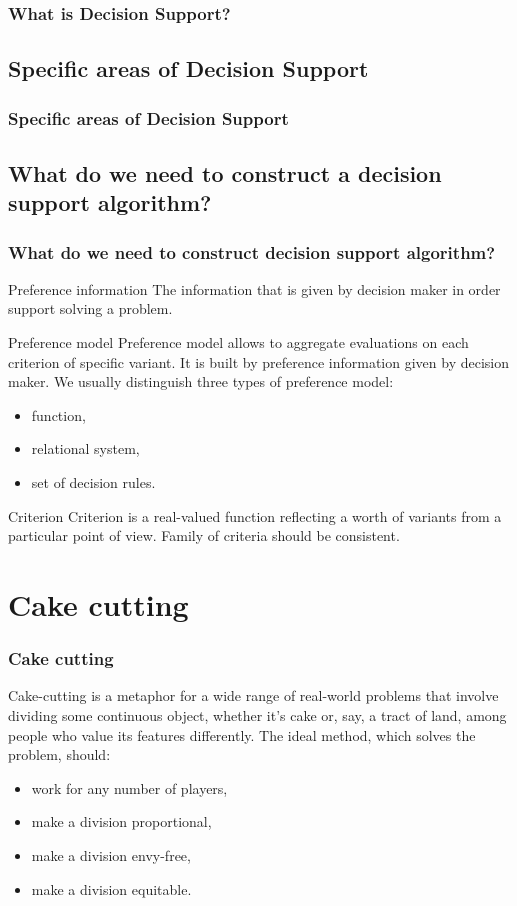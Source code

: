 \documentclass{beamer}
\begin{document}
\begin{frame}
\frametitle{What is Decision Support?}

\end{frame}


\subsection{Specific areas of Decision Support}
\begin{frame}
\frametitle{Specific areas of Decision Support}
\end{frame}

\subsection{What do we need to construct a decision support algorithm?}
\begin{frame}
\frametitle{What do we need to construct decision support algorithm?}
\begin{block}{Preference information}
The information that is given by decision maker in order support solving a problem.
\end{block}
\begin{block}{Preference model}
Preference model allows to aggregate evaluations on each criterion of specific variant.
It is built by preference information given by decision maker. We usually distinguish three types of preference model:
\begin{itemize}
\item function,
\item relational system,
\item set of decision rules.
\end{itemize}
\end{block}
\begin{block}{Criterion}
Criterion is a real-valued function reflecting a worth of variants from a particular point of view. Family of criteria should be consistent.
\end{block}
\end{frame}


\section{Cake cutting}
\begin{frame}
\frametitle{Cake cutting}
Cake-cutting is a metaphor for a wide range of real-world problems that involve dividing some continuous object, whether it’s cake or, say, a tract of land, among people who value its features differently. 
The ideal method, which solves the problem, should:
\begin{itemize}
\item work for any number of players,
\item make a division proportional,
\item make a division envy-free, 
\item make a division equitable. 
\end{itemize}

\end{frame}
\end{document}
